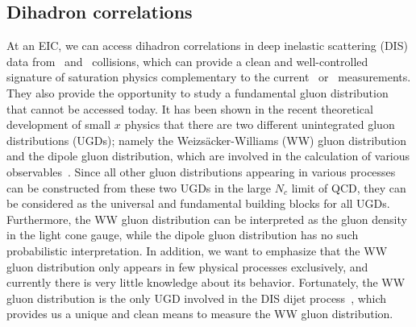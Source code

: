 \subsection{Dihadron correlations}  \label{subsec:dihadron_preintro}
At an EIC, we can access dihadron correlations in deep inelastic scattering
(DIS) data from \eA\ and \ep\ collisions, which can provide a clean and
well-controlled signature of saturation physics complementary to the current \dA\
or \pA\ measurements. They also provide the opportunity to study a fundamental
gluon distribution that cannot be accessed today. It has been shown in the
recent theoretical development of small $x$ physics that there are two different
unintegrated gluon distributions (UGDs); namely the Weizs\"{a}cker-Williams (WW)
gluon distribution and the dipole gluon distribution, which are involved in the
calculation of various observables~\cite{Dominguez:2010xd}. Since all other
gluon distributions appearing in various processes can be constructed from these
two UGDs in the large $N_c$ limit of QCD, they can be considered as the
universal and fundamental building blocks for all UGDs. Furthermore, the WW
gluon distribution can be interpreted as the gluon density in the light cone
gauge, while the dipole gluon distribution has no such probabilistic
interpretation. In addition, we want to emphasize that the WW gluon distribution
only appears in few physical processes exclusively, and currently there is very
little knowledge about its behavior. Fortunately, the WW gluon distribution is
the only UGD involved in the DIS dijet process~\cite{Dominguez:2011wm}, which
provides us a unique and clean means to measure the WW gluon distribution.



